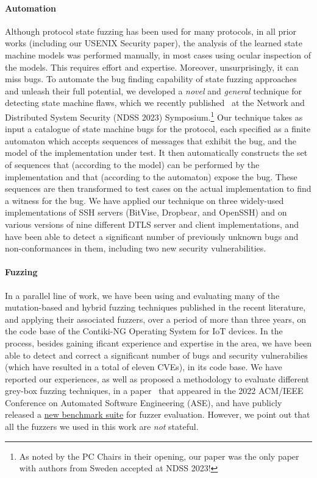 \documentclass[11pt]{article}
\newcommand{\myparagraph}{}
\let\myparagraph=\paragraph
\renewcommand{\paragraph}{\vspace{-3mm}\myparagraph}
\begin{document}
\paragraph{Automation}
Although protocol state fuzzing has been used for many protocols, in all prior
works (including our USENIX Security paper), the analysis of the learned state
machine models was performed manually, in most cases using ocular inspection
of the models.  This requires effort and expertise.  Moreover, unsurprisingly,
it can miss bugs.  To automate the bug finding capability of state fuzzing
approaches and unleash their full potential, we developed a \emph{novel} and
\emph{general} technique for detecting state machine flaws, which we recently
published~\cite{AutomataBased@NDSS-23} at the Network and Distributed System
Security (NDSS 2023) Symposium.\footnote{As noted by the PC Chairs in their
opening, our paper was the only paper with authors from Sweden accepted at
NDSS 2023!}
%
Our technique takes as input a catalogue of state machine bugs for the
protocol, each specified as a finite automaton which accepts sequences of
messages that exhibit the bug, and the model of the implementation under
test. It then automatically constructs the set of sequences that (according to
the model) can be performed by the implementation and that (according to the
automaton) expose the bug. These sequences are then transformed to test cases
on the actual implementation to find a witness for the bug. We have applied
our technique on three widely-used implementations of SSH servers (BitVise,
Dropbear, and OpenSSH) and on various versions of nine different DTLS server
and client implementations, and have been able to detect a significant number
of previously unknown bugs and non-conformances in them, including two new
security vulnerabilities.

\paragraph{Fuzzing}
In a parallel line of work, we have been using and evaluating many of the
mutation-based and hybrid fuzzing techniques published in the recent
literature, and applying their associated fuzzers, over a period of more than
three years, on the code base of the Contiki-NG Operating System for IoT
devices. In the process, besides gaining ificant experience and expertise in
the area, we have been able to detect and correct a significant number of bugs
and security vulnerabilies (which have resulted in a total of eleven CVEs), in
its code base. We have reported our experiences, as well as proposed a
methodology to evaluate different grey-box fuzzing techniques, in a
paper~\cite{SoManyFuzzers@ASE-22} that appeared in the 2022 ACM/IEEE
Conference on Automated Software Engineering (ASE), and have publicly released
a \href{https://github.com/assist-project/so-many-fuzzers-artifact}{new
  benchmark suite} for fuzzer evaluation.
%
However, we point out that all the fuzzers we used in this work are \emph{not}
stateful.
\end{document}
